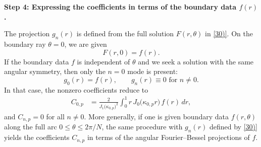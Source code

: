 \documentclass{article}
\begin{document}
\medskip

\noindent
\textbf{Step 4: Expressing the coefficients in terms of the boundary data \(f(r)\).}

The projection \(g_n(r)\) is defined from the full solution \(F(r,\theta)\) in
\eqref{30)}. On the boundary ray \(\theta=0\), we are given
\[
F(r,0) = f(r).
\]
If the boundary data \(f\) is independent of \(\theta\) and we seek a solution
with the same angular symmetry, then only the \(n=0\) mode is present:
\[
g_0(r) = f(r), \qquad g_n(r) \equiv 0 \text{ for } n\neq 0.
\]
In that case, the nonzero coefficients reduce to
\begin{align}
C_{0,p}
&=
\frac{2}{J_{1}\bigl(\kappa_{0,p}\bigr)^2}
\int_0^1 r\,J_{0}\bigl(\kappa_{0,p} r\bigr)\,f(r)\,dr, \tag{36)}
\end{align}
and \(C_{n,p}=0\) for all \(n\neq 0\). More generally, if one is given boundary
data \(f(r,\theta)\) along the full arc \(0\leq\theta\leq 2\pi/N\), the same
procedure with \(g_n(r)\) defined by \eqref{30)} yields the coefficients
\(C_{n,p}\) in terms of the angular Fourier–Bessel projections of \(f\).
\end{document}
